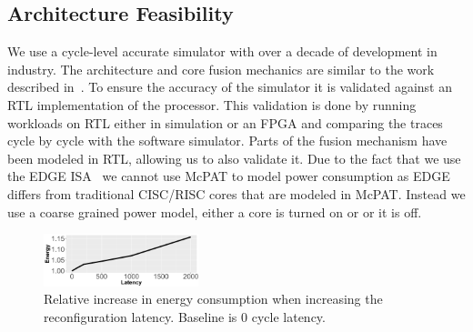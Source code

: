 \subsection{Architecture Feasibility}
We use a cycle-level accurate simulator with over a decade of development in industry.
The architecture and core fusion mechanics are similar to the work described in~\cite{kim2007tflex,putnam2010e2}.
To ensure the accuracy of the simulator it is validated against an RTL implementation of the processor.
This validation is done by running workloads on RTL either in simulation or an FPGA and comparing the traces cycle by cycle with the software simulator.
Parts of the fusion mechanism have been modeled in RTL, allowing us to also validate it.
Due to the fact that we use the EDGE ISA~\cite{smith2006edge} we cannot use McPAT to model power consumption as EDGE differs from traditional CISC/RISC cores that are modeled in McPAT.
Instead we use a coarse grained power model, either a core is turned on or or it is off. 


\begin{figure}[t]
    \centering
	\includegraphics[width=0.4\textwidth]{cases-paper/graphics/Exploration/lat_en_2000.pdf}
\vspace*{-5mm}
    \caption{Relative increase in energy consumption when increasing the reconfiguration latency. Baseline is 0 cycle latency.}
    \label{fig:enlatency}
\end{figure}
